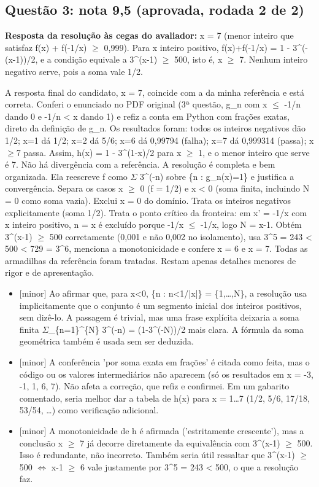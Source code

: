 \documentclass{article}%
\begin{document}
\subsection*{Questão 3: nota 9,5 (aprovada, rodada 2 de 2)}%
\textbf{Resposta da resolução às cegas do avaliador:} x = 7 (menor inteiro que satisfaz f(x) + f(-1/x) $\geq$ 0,999). Para x inteiro positivo, f(x)+f(-1/x) = 1 - 3\^{}(-(x-1))/2, e a condição equivale a 3\^{}(x-1) $\geq$ 500, isto é, x $\geq$ 7. Nenhum inteiro negativo serve, pois a soma vale 1/2.\par %
A resposta final do candidato, x = 7, coincide com a da minha referência e está correta. Conferi o enunciado no PDF original (3ª questão, g\_n com x $\leq$ {-}1/n dando 0 e {-}1/n < x dando 1) e refiz a conta em Python com frações exatas, direto da definição de g\_n. Os resultados foram: todos os inteiros negativos dão 1/2; x=1 dá 1/2; x=2 dá 5/6; x=6 dá 0,99794 (falha); x=7 dá 0,999314 (passa); x$\geq$7 passa. Assim, h(x) = 1 - 3\^{}(1-x)/2 para x $\geq$ 1, e o menor inteiro que serve é 7. Não há divergência com a referência.\newline%
\newline%
A resolução é completa e bem organizada. Ela reescreve f como $\Sigma$ 3\^{}({-}n) sobre \{n : g\_n(x)=1\} e justifica a convergência. Separa os casos x $\geq$ 0 (f = 1/2) e x < 0 (soma finita, incluindo N = 0 como soma vazia). Exclui x = 0 do domínio. Trata os inteiros negativos explicitamente (soma 1/2). Trata o ponto crítico da fronteira: em x' = -1/x com x inteiro positivo, n = x é excluído porque -1/x $\leq$ -1/x, logo N = x-1. Obtém 3\^{}(x-1) $\geq$ 500 corretamente (0,001 e não 0,002 no isolamento), usa 3\^{}5 = 243 < 500 < 729 = 3\^{}6, menciona a monotonicidade e confere x = 6 e x = 7. Todas as armadilhas da referência foram tratadas. Restam apenas detalhes menores de rigor e de apresentação.%
\begin{itemize}%
\item%
{[}minor{]} Ao afirmar que, para x<0, \{n : n<1/|x|\} = \{1,\ldots{},N\}, a resolução usa implicitamente que o conjunto é um segmento inicial dos inteiros positivos, sem dizê{-}lo. A passagem é trivial, mas uma frase explícita deixaria a soma finita $\Sigma$\_\{n=1\}\^{}\{N\} 3\^{}({-}n) = (1-3\^{}({-}N))/2 mais clara. A fórmula da soma geométrica também é usada sem ser deduzida.%
\item%
{[}minor{]} A conferência 'por soma exata em frações' é citada como feita, mas o código ou os valores intermediários não aparecem (só os resultados em x = -3, -1, 1, 6, 7). Não afeta a correção, que refiz e confirmei. Em um gabarito comentado, seria melhor dar a tabela de h(x) para x = 1\ldots{}7 (1/2, 5/6, 17/18, 53/54, \ldots{}) como verificação adicional.%
\item%
{[}minor{]} A monotonicidade de h é afirmada ('estritamente crescente'), mas a conclusão x $\geq$ 7 já decorre diretamente da equivalência com 3\^{}(x-1) $\geq$ 500. Isso é redundante, não incorreto. Também seria útil ressaltar que 3\^{}(x-1) $\geq$ 500 $\Leftrightarrow$ x-1 $\geq$ 6 vale justamente por 3\^{}5 = 243 < 500, o que a resolução faz.%
\end{itemize}%
\end{document}
